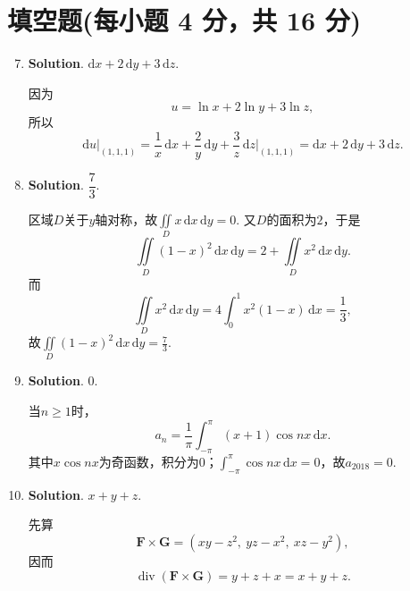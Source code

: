 \documentclass[../main.tex]{subfiles}
\begin{document}
\section{填空题(每小题 4 分，共 16 分)}
\begin{enumerate}
    \setcounter{enumi}{6}
    \item \textbf{Solution}. $\mathrm{d}x+2\,\mathrm{d}y+3\,\mathrm{d}z$.

          因为
          \[
              u=\ln x+2\ln y+3\ln z,
          \]
          所以
          \[
              \mathrm{d}u\big|_{(1,1,1)}
              =\frac{1}{x}\,\mathrm{d}x+\frac{2}{y}\,\mathrm{d}y+\frac{3}{z}\,\mathrm{d}z\bigg|_{(1,1,1)}
              =\mathrm{d}x+2\,\mathrm{d}y+3\,\mathrm{d}z.
          \]

    \item \textbf{Solution}. $\dfrac{7}{3}$.

          区域$D$关于$y$轴对称，故$\iint\limits_D x\,\mathrm{d}x\,\mathrm{d}y=0$. 又$D$的面积为$2$，于是
          \[
              \iint\limits_D(1-x)^2\,\mathrm{d}x\,\mathrm{d}y
              =2+\iint\limits_Dx^2\,\mathrm{d}x\,\mathrm{d}y.
          \]
          而
          \[
              \iint\limits_Dx^2\,\mathrm{d}x\,\mathrm{d}y
              =4\int_0^1x^2(1-x)\,\mathrm{d}x=\frac13,
          \]
          故$\iint\limits_D(1-x)^2\,\mathrm{d}x\,\mathrm{d}y=\frac{7}{3}$.

    \item \textbf{Solution}. $0$.

          当$n\ge1$时，
          \[
              a_n=\frac{1}{\pi}\int_{-\pi}^{\pi}(x+1)\cos nx\,\mathrm{d}x.
          \]
          其中$x\cos nx$为奇函数，积分为$0$；$\int_{-\pi}^{\pi}\cos nx\,\mathrm{d}x=0$，故$a_{2018}=0$.

    \item \textbf{Solution}. $x+y+z$.

          先算
          \[
              \boldsymbol{F}\times\boldsymbol{G}=(xy-z^2,\ yz-x^2,\ xz-y^2),
          \]
          因而
          \[
              \operatorname{div}(\boldsymbol{F}\times\boldsymbol{G})=y+z+x=x+y+z.
          \]

\end{enumerate}
\end{document}
